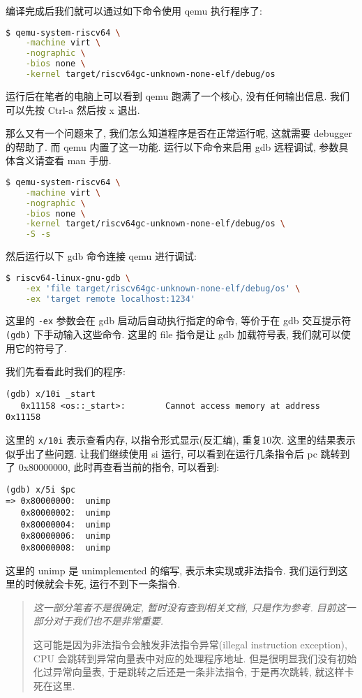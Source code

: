 \documentclass[a4paper]{ctexart}
\begin{document}
编译完成后我们就可以通过如下命令使用 qemu 执行程序了:
\begin{lstlisting}[language=bash]
$ qemu-system-riscv64 \
    -machine virt \
    -nographic \
    -bios none \
    -kernel target/riscv64gc-unknown-none-elf/debug/os
\end{lstlisting}
运行后在笔者的电脑上可以看到 qemu 跑满了一个核心,
没有任何输出信息.
我们可以先按 Ctrl-a 然后按 x 退出.

那么又有一个问题来了,
我们怎么知道程序是否在正常运行呢,
这就需要 debugger 的帮助了.
而 qemu 内置了这一功能.
运行以下命令来启用 gdb 远程调试,
参数具体含义请查看 man 手册.
\begin{lstlisting}[language=bash]
$ qemu-system-riscv64 \
    -machine virt \
    -nographic \
    -bios none \
    -kernel target/riscv64gc-unknown-none-elf/debug/os \
    -S -s
\end{lstlisting}

然后运行以下 gdb 命令连接 qemu 进行调试:
\begin{lstlisting}[language=bash]
$ riscv64-linux-gnu-gdb \
    -ex 'file target/riscv64gc-unknown-none-elf/debug/os' \
    -ex 'target remote localhost:1234'
\end{lstlisting}
这里的 \verb|-ex| 参数会在 gdb 启动后自动执行指定的命令,
等价于在 gdb 交互提示符 \verb|(gdb)| 下手动输入这些命令.
这里的 file 指令是让 gdb 加载符号表,
我们就可以使用它的符号了.

我们先看看此时我们的程序:
\begin{lstlisting}
(gdb) x/10i _start
   0x11158 <os::_start>:        Cannot access memory at address 0x11158
\end{lstlisting}
这里的 \verb|x/10i| 表示查看内存,
以指令形式显示(反汇编), 重复10次.
这里的结果表示似乎出了些问题.
让我们继续使用 si 运行,
可以看到在运行几条指令后 pc 跳转到了
0x80000000, 此时再查看当前的指令,
可以看到:
\begin{lstlisting}
(gdb) x/5i $pc
=> 0x80000000:  unimp
   0x80000002:  unimp
   0x80000004:  unimp
   0x80000006:  unimp
   0x80000008:  unimp
\end{lstlisting}
这里的 unimp 是 unimplemented 的缩写,
表示未实现或非法指令.
我们运行到这里的时候就会卡死, 运行不到下一条指令.

\begin{quote}
{\itshape
这一部分笔者不是很确定, 暂时没有查到相关文档,
只是作为参考. 目前这一部分对于我们也不是非常重要.

这可能是因为非法指令会触发非法指令异常(illegal
instruction exception),
CPU 会跳转到异常向量表中对应的处理程序地址.
但是很明显我们没有初始化过异常向量表,
于是跳转之后还是一条非法指令, 于是再次跳转,
就这样卡死在这里.
}
\end{quote}
\end{document}
